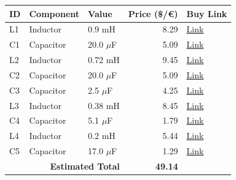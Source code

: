 \begin{table}[H]
    \centering
    \renewcommand{\arraystretch}{1.5}
    \begin{tabular}{@{}lllrl@{}}
        \toprule
        \textbf{ID} & \textbf{Component} & \textbf{Value} & \textbf{Price (\$/€)} & \textbf{Buy Link} \\
        \midrule
        L1 & Inductor & 0.9 mH & 8.29 & \href{https://www.parts-express.com/Dayton-Audio-LW18-90-0.90mH-18-AWG-Perfect-Layer-Inductor-257-824}{Link} \\
        C1 & Capacitor & 20.0 $\mu$F & 5.09 & \href{https://www.parts-express.com/Solen-20uF-400V-Polypropylene-Capacitor-027-582}{Link} \\
        L2 & Inductor & 0.72 mH & 9.45 & \href{https://www.soundimports.eu/en/jantzen-audio-000-5820.html}{Link} \\
        C2 & Capacitor & 20.0 $\mu$F & 5.09 & \href{https://www.parts-express.com/Solen-20uF-400V-Polypropylene-Capacitor-027-582}{Link} \\
        C3 & Capacitor & 2.5 $\mu$F & 4.25 & \href{https://www.soundimports.eu/en/audyn-q4-2-5-400.html}{Link} \\
        L3 & Inductor & 0.38 mH & 8.45 & \href{https://www.soundimports.eu/en/jantzen-audio-000-1837.html}{Link} \\
        C4 & Capacitor & 5.1 $\mu$F & 1.79 & \href{https://www.parts-express.com/Solen-5.1uF-400V-Polypropylene-Capacitor-027-554}{Link} \\
        L4 & Inductor & 0.2 mH & 5.44 & \href{https://www.soundimports.eu/en/dayton-audio-lw18-20.html}{Link} \\
        C5 & Capacitor & 17.0 $\mu$F & 1.29 & \href{https://www.parts-express.com/17uF-100V-Non-Polarized-Capacitor-027-346}{Link} \\
        \midrule
        \multicolumn{3}{r}{\textbf{Estimated Total}} & \textbf{49.14} & \\
        \bottomrule
    \end{tabular}
\end{table}
